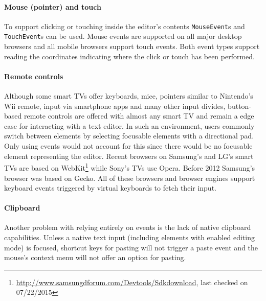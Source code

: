 \paragraph{Mouse (pointer) and touch} To support clicking or touching inside the editor's contents \texttt{MouseEvent}s and \texttt{TouchEvent}s can be used. Mouse events are supported on all major desktop browsers and all mobile browsers support touch events. Both event types support reading the coordinates indicating where the click or touch has been performed.

\paragraph{Remote controls} Although some smart TVs offer keyboards, mice, pointers similar to Nintendo's Wii remote, input via smartphone apps and many other input divides, button-based remote controls are offered with almost any smart TV and remain a edge case for interacting with a text editor. In such an environment, users commonly switch between elements by selecting focusable elements with a directional pad. Only using events would not account for this since there would be no focusable element representing the editor. Recent browsers on Samsung's and LG's smart TVs are based on WebKit\footnote{\url{http://www.samsungdforum.com/Devtools/Sdkdownload}, last checked on 07/22/2015} while Sony's TVs use Opera. Before 2012 Samsung's browser was based on Gecko. All of these browsers and browser engines support keyboard events triggered by virtual keyboards to fetch their input.

\paragraph{Clipboard} Another problem with relying entirely on events is the lack of native clipboard capabilities. Unless a native text input (including elements with enabled editing mode) is focused, shortcut keys for pasting will not trigger a paste event and the mouse's context menu will not offer an option for pasting. %

